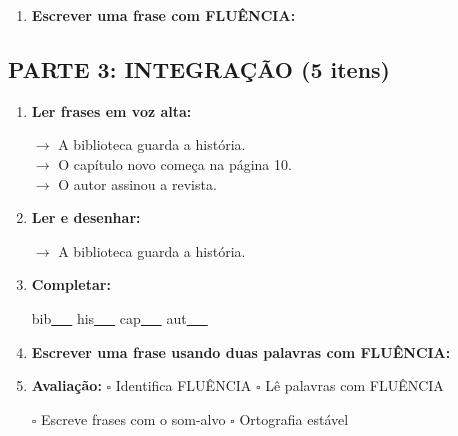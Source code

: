 \begin{exercicio}
\begin{enumerate}[resume]
  \item \textbf{Escrever uma frase com FLUÊNCIA:}
  \begin{center}
  \underline{\hspace{12cm}}
  \end{center}

\end{enumerate}

\subsection*{PARTE 3: INTEGRAÇÃO (5 itens)}

\begin{enumerate}[resume]

  \item \textbf{Ler frases em voz alta:}
  \begin{center}
  $\rightarrow$ A biblioteca guarda a história.\\
  $\rightarrow$ O capítulo novo começa na página 10.\\
  $\rightarrow$ O autor assinou a revista.\\
  \end{center}

  \item \textbf{Ler e desenhar:}
  \begin{center}
  $\rightarrow$ A biblioteca guarda a história.
  \end{center}
  \begin{center}
  \end{center}

  \item \textbf{Completar:}
  \begin{center}
  bib\underline{~~~} \quad his\underline{~~~} \quad cap\underline{~~~} \quad aut\underline{~~~}
  \end{center}

  \item \textbf{Escrever uma frase usando duas palavras com FLUÊNCIA:}
  \begin{center}
  \underline{\hspace{12cm}}
  \end{center}

  \item \textbf{Avaliação:} $\square$ Identifica FLUÊNCIA \quad $\square$ Lê palavras com FLUÊNCIA
  \begin{center}
  $\square$ Escreve frases com o som-alvo \quad $\square$ Ortografia estável
  \end{center}


\end{enumerate}
\end{exercicio}
